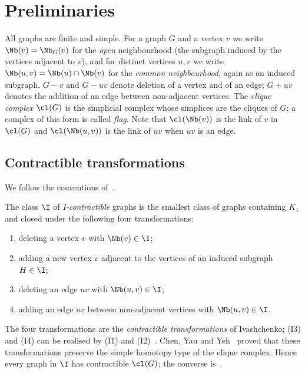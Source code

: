 \section{Preliminaries}\label{sec:prelim}

All graphs are finite and simple. For a graph $G$ and a vertex $v$ we write $\Nb(v)=\Nb_G(v)$ for the \emph{open} neighbourhood (the subgraph induced by the vertices adjacent to $v$), and for distinct vertices $u,v$ we write $\Nb(u,v)=\Nb(u)\cap\Nb(v)$ for the \emph{common neighbourhood}, again as an induced subgraph. $G-v$ and $G-uv$ denote deletion of a vertex and of an edge; $G+uv$ denotes the addition of an edge between non-adjacent vertices. The \emph{clique complex} $\cl(G)$ is the simplicial complex whose simplices are the cliques of $G$; a complex of this form is called \emph{flag}. Note that $\cl(\Nb(v))$ is the link of $v$ in $\cl(G)$ and $\cl(\Nb(u,v))$ is the link of $uv$ when $uv$ is an edge.

\subsection{Contractible transformations}

We follow the conventions of~\cite{DEFH2023}.

\begin{definition}\label{def:I}
The class $\I$ of \emph{I-contractible} graphs is the smallest class of graphs containing $K_1$ and closed under the following four transformations:
\begin{enumerate}[label=(I\arabic*),leftmargin=3em]
\item deleting a vertex $v$ with $\Nb(v)\in\I$;
\item adding a new vertex $v$ adjacent to the vertices of an induced subgraph $H\in\I$;
\item deleting an edge $uv$ with $\Nb(u,v)\in\I$;
\item adding an edge $uv$ between non-adjacent vertices with $\Nb(u,v)\in\I$.
\end{enumerate}
\end{definition}

The four transformations are the \emph{contractible transformations} of Ivashchenko; (I3) and (I4) can be realised by (I1) and (I2)~\cite[Lemma~3]{DEFH2023}. Chen, Yau and Yeh~\cite{ChenYauYeh2001} proved that these transformations preserve the simple homotopy type of the clique complex. Hence every graph in $\I$ has contractible $\cl(G)$; the converse is~\cite[Corollary~1.5]{DochtermannMatsushita2025}.

